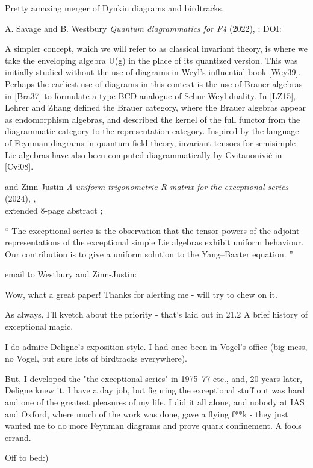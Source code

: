 \begin{description}
Pretty amazing merger of Dynkin diagrams and birdtracks.

\item[2024-02-27 Predrag]
A. Savage and B. Westbury
{\em Quantum diagrammatics for F4} (2022), ;
 {DOI}:

A simpler concept, which we will refer to as classical invariant theory,
is where we take the enveloping algebra U(g) in the place of its
quantized version. This was initially studied without the use of diagrams
in Weyl’s influential book [Wey39]. Perhaps the earliest use of diagrams
in this context is the use of Brauer algebras in [Bra37] to formulate a
type-BCD analogue of Schur-Weyl duality. In [LZ15], Lehrer and Zhang
defined the Brauer category, where the Brauer algebras appear as
endomorphism algebras, and described the kernel of the full functor from
the diagrammatic category to the representation category. Inspired by the
language of Feynman diagrams in quantum field theory, invariant tensors
for semisimple Lie algebras have also been computed diagrammatically by
Cvitanonivi\'c in [Cvi08].

\item[2024-06-03 Westbury] and Zinn-Justin %
{\em A uniform trigonometric R-matrix for the exceptional series} (2024),
,\\ 
extended 8-page abstract ;

``
The exceptional series is the observation that the tensor powers of the
adjoint representations of the exceptional simple Lie algebras exhibit uniform behaviour.
Our contribution is to give a uniform solution to the Yang–Baxter equation.
''

\item[2024-06-06 Predrag] email to  Westbury and Zinn-Justin:

Wow, what a great paper! Thanks for alerting me - will try to chew on it.

As always, I'll kvetch about the priority - that's laid out in
{21.2 A brief history of exceptional magic}.

I do admire Deligne's exposition style. I had once been in Vogel's office
(big mess, no Vogel, but sure lots of birdtracks everywhere).

But, I developed the "the exceptional series" in 1975–77 etc., and, 20
years later,  Deligne
 {knew it}.
I have a day job, but figuring the exceptional stuff out was hard and
one of the greatest pleasures of my life. I did it all alone, and nobody
at IAS and Oxford, where much of the work was done, gave a flying f**k -
they just wanted me to do more Feynman diagrams and prove quark
confinement. A fools errand.

Off to bed:)







\end{description}
\renewcommand{\ssp}{a}


\printbibliography[heading=subbibintoc,title={References}]
